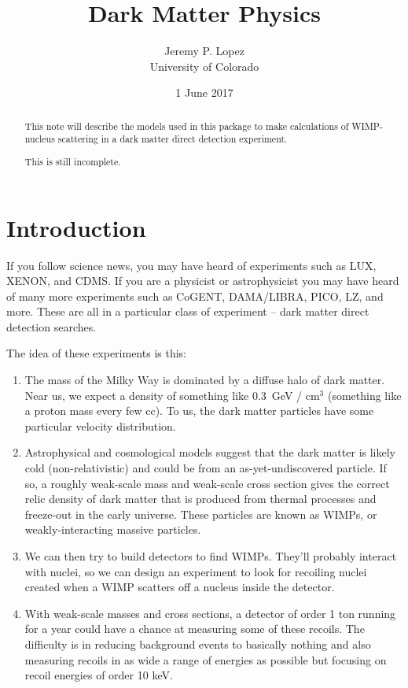 \documentclass{article}
\title{Dark Matter Physics}
\author{Jeremy P. Lopez \\ University of Colorado}
\date{1 June 2017}
\begin{document}
\maketitle

\begin{abstract}
This note will describe the models used in this package
to make calculations of WIMP-nucleus scattering in a
dark matter direct detection experiment.

This is still incomplete.
\end{abstract}
\tableofcontents
\section{Introduction}

If you follow science news, you may have heard of 
experiments such as LUX, XENON, and CDMS.
If you are a physicist or astrophysicist you may
have heard of many more experiments such as 
CoGENT, DAMA/LIBRA, PICO, LZ, and more.
These are all in a particular class of experiment --
dark matter direct detection searches.

The idea of these experiments is this:
\begin{enumerate}
  \item The mass of the Milky Way is dominated by a diffuse halo of dark matter. Near us, we expect a density of something like 0.3~GeV / cm$^3$ (something like a proton mass every few cc). To us, the dark matter particles have some particular velocity distribution.
  \item Astrophysical and cosmological models suggest that the dark matter is likely cold (non-relativistic) and could be from an as-yet-undiscovered particle. If so, a roughly weak-scale mass and weak-scale cross section gives the correct relic density of dark matter that is produced from thermal processes and freeze-out in the early universe. These particles are known as WIMPs, or weakly-interacting massive particles.
  \item We can then try to build detectors to find WIMPs. They'll probably interact with nuclei, so we can design an experiment to look for recoiling nuclei created when a WIMP scatters off a nucleus inside the detector.
  \item With weak-scale masses and cross sections, a detector of order 1 ton running for a year could have a chance at measuring some of these recoils. The difficulty is in reducing background events to basically nothing and also measuring recoils in as wide a range of energies as possible but focusing on recoil energies of order 10 keV.
\end{enumerate}
\end{document}
